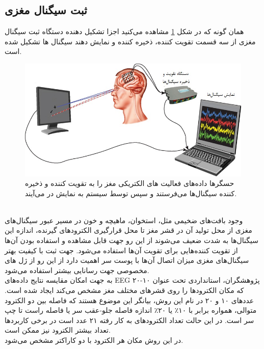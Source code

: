\subsection{ثبت سیگنال مغزی}
همان گونه که در شکل
\ref{fig:fnhum-05-00089-g002}
مشاهده می‌کنید اجزا تشکیل دهنده دستگاه ثبت سیگنال مغزی از سه قسمت تقویت کننده، ذخیره کننده و نمایش دهند سیگنال ها تشکیل شده است.
\begin{figure}[htbp]
	\centering
	\includegraphics[width=0.9\linewidth]{figures/fnhum-05-00089-g002}
	\caption[اجزا دستگاه ثبت سیگنال مغزی]{حسگر‌ها داده‌های فعالیت های الکتریکی مغز را به تقویت کننده و ذخیره کننده سیگنال‌ها می‌فرستند و سپس توسط سیستم به نمایش در می‌آیند.}
	\label{fig:fnhum-05-00089-g002}
\end{figure}
\\
وجود بافت‌های ضخیمی مثل، استخوان، ماهیچه و خون در مسیر عبور سیگنال‌های مغزی  از محل تولید آن در قشر مغز تا محل قرارگیری الکترود‌های گیرنده، اندازه این سیگنال‌ها به شدت ضعیف می‌شوند از این رو جهت قابل مشاهده و استفاده بودن آن‌ها از تقویت کننده‌هایی برای تقویت آن‌ها استفاده می‌شود.
\cite{kheradpisheh2014evidence}
جهت ثبت با کیفیت بهتر سیگنال‌های مغزی میزان اتصال آن‌ها با پوست سر اهمیت دارد از این رو از ژل های مخصوصی جهت رسانایی بیشتر استفاده می‌شود.
\\
به جهت امکان مقایسه نتایج داده‌های EEG پژوهشگران، استانداردی تحت عنوان ۱۰-۲۰ که مکان الکترودها را روی قشر‌های مختلف مغز مشخص می‌کند ایجاد شده است. عددهای ۱۰ و ۲۰ در نام این روش، بیانگر این موضوع هستند که فاصله بین دو الکترود متوالی، همواره برابر با ۱۰٪ یا ۲۰٪ اندازه فاصله جلو-عقب سر یا فاصله راست تا چپ سر است. در این حالت تعداد الکترود‌های به کار رفته ۲۱ عدد است در برخی کاربرد‌ها تعداد بیشتر الکترود نیز ممکن است.
\\
در این روش مکان هر الکترود با دو کاراکتر مشخص می‌شود.

